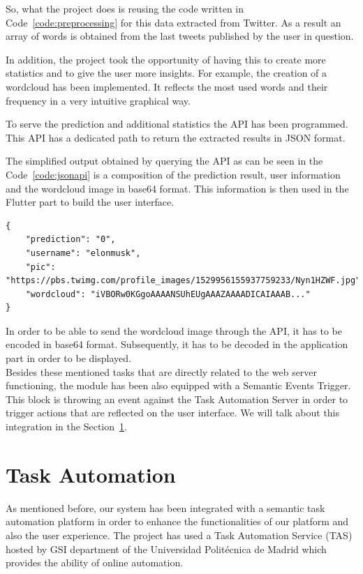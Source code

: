 So, what the project does is reusing the code written in Code~\ref{code:preprocessing} for this data extracted from Twitter. As a result an array of words is obtained from the last tweets published by the user in question.

In addition, the project took the opportunity of having this to create more statistics and to give the user more insights. For example, the creation of a wordcloud has been implemented. It reflects the most used words and their frequency in a very intuitive graphical way.

To serve the prediction and additional statistics the API has been programmed. This API has a dedicated path to return the extracted results in JSON format.

The simplified output obtained by querying the API as can be seen in the Code~\ref{code:jsonapi} is a composition of the prediction result, user information and the wordcloud image in base64 format. This information is then used in the Flutter part to build the user interface.

\begin{lstlisting}[caption={JSON output from API}, label={code:jsonapi}]
{
    "prediction": "0", 
    "username": "elonmusk", 
    "pic": "https://pbs.twimg.com/profile_images/1529956155937759233/Nyn1HZWF.jpg", 
    "wordcloud": "iVBORw0KGgoAAAANSUhEUgAAAZAAAADICAIAAAB..."
}
\end{lstlisting}


In order to be able to send the wordcloud image through the API, it has to be encoded in base64 format. Subsequently, it has to be decoded in the application part in order to be displayed.\\

Besides these mentioned tasks that are directly related to the web server functioning, the module has been also equipped with a Semantic Events Trigger. This block is throwing an event against the Task Automation Server in order to trigger actions that are reflected on the user interface. We will talk about this integration in the Section~\ref{sec:taskautomation}.

\section{Task Automation}
\label{sec:taskautomation}
As mentioned before, our system has been integrated with a semantic task automation platform in order to enhance the functionalities of our platform and also the user experience. The project has used a Task Automation Service (TAS) hosted by GSI department of the Universidad Politécnica de Madrid which provides the ability of online automation.

